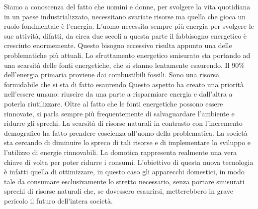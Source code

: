 Siamo a conoscenza del fatto che uomini e donne, per svolgere la vita quotidiana in un paese industrializzato, necessitano svariate risorse ma quella che gioca un ruolo fondmentale è l’energia. L’uomo necessita sempre più energia per svolgere le sue attività, difatti, da circa due secoli a questa parte il fabbisogno energetico è cresciuto enormemente. Questo bisogno eccessivo risulta appunto una delle problematiche più attuali. Lo sfruttamento energetico smisurato sta portando ad una scarsità delle fonti energetiche, che si stanno lentamente esaurendo. Il 90\% dell’energia primaria proviene dai combustibili fossili. Sono una risorsa formidabile che si sta di fatto esaurendo 
Questo aspetto ha creato una priorità nell’essere umano: riuscire da una parte a risparmiare energia e dall’altra a poterla riutilizzare. 
Oltre al fatto che le fonti energetiche possono essere rinnovate, si parla sempre più frequentemente di salvaguardare l’ambiente e ridurre gli sprechi. 
La scarsità di risorse naturali in contrasto con l’incremento demografico ha fatto prendere coscienza all’uomo della problematica. La società sta cercando di diminuire lo spreco di tali risorse e di implementare lo sviluppo e l’utilizzo di energie rinnovabili.
La domotica rappresenta realmente una vera chiave di volta per poter ridurre i consumi. L’obiettivo di questa nuova tecnologia è infatti quella di ottimizzare, in questo caso gli apparecchi domestici, in modo tale da consumare esclusivamente lo stretto necessario, senza portare smisurati sprechi di risorse naturali che, se dovessero esaurirsi, metterebbero in grave pericolo il futuro dell’intera società.
